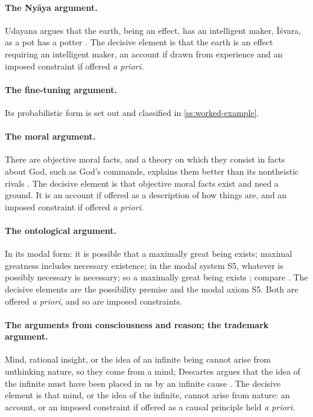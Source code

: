 \paragraph{The Nyāya argument.} Udayana argues that the earth, being an effect, has an intelligent
maker, Īśvara, as a pot has a potter \citep{dasti2011}. The decisive element is that the earth is an
effect requiring an intelligent maker, an account if drawn from experience and an imposed
constraint if offered \emph{a priori}.

\paragraph{The fine-tuning argument.} Its probabilistic form is set out and classified in
\cref{ss:worked-example}.

\paragraph{The moral argument.} There are objective moral facts, and a theory on which they consist
in facts about God, such as God's commands, explains them better than its nontheistic rivals
\citep{adams1987}. The decisive element is that objective moral facts exist and need a ground. It is
an account if offered as a description of how things are, and an imposed constraint if offered
\emph{a priori}.

\paragraph{The ontological argument.} In its modal form: it is possible that a maximally great being
exists; maximal greatness includes necessary existence; in the modal system S5, whatever is possibly
necessary is necessary; so a maximally great being exists \citep{plantinga1974}; compare
\citet[ch.~2--3]{anselm-proslogion}. The decisive elements are the possibility premise and the modal
axiom S5. Both are offered \emph{a priori}, and so are imposed constraints.

\paragraph{The arguments from consciousness and reason; the trademark argument.} Mind, rational
insight, or the idea of an infinite being cannot arise from unthinking nature, so they come from a
mind; Descartes argues that the idea of the infinite must have been placed in us by an infinite cause
\citep[Meditation~III]{descartes1641}. The decisive element is that mind, or the idea of the
infinite, cannot arise from nature: an account, or an imposed constraint if offered as a causal
principle held \emph{a priori}.

